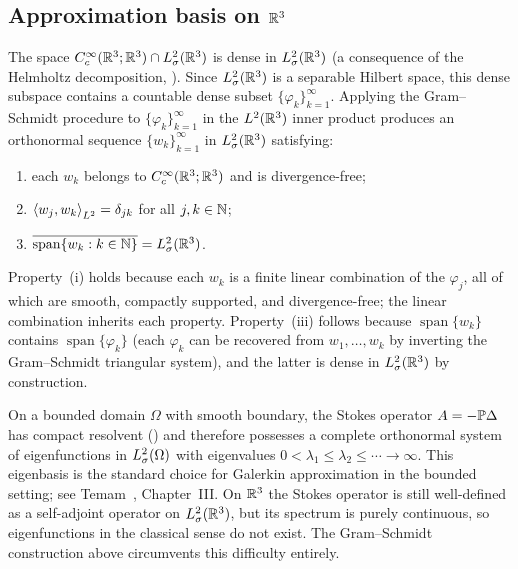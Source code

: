 \subsection{Approximation basis on $\mathbb{R}^{3}$}

The space $C^\infty_c(\mathbb{R}^{3};\mathbb{R}^{3}) \cap L^{2}_\sigma(\mathbb{R}^{3})$ is dense in $L^{2}_\sigma(\mathbb{R}^{3})$
(a consequence of the Helmholtz decomposition, ).
Since $L^{2}_\sigma(\mathbb{R}^{3})$ is a separable Hilbert space, this dense subspace
contains a countable dense subset
$\{\varphi_{k}\}_{k=1}^{\infty}$.  Applying the Gram--Schmidt procedure to
$\{\varphi_{k}\}_{k=1}^{\infty}$ in the $L^{2}(\mathbb{R}^{3})$ inner product produces an
orthonormal sequence $\{w_{k}\}_{k=1}^{\infty}$ in $L^{2}_\sigma(\mathbb{R}^{3})$ satisfying:
\begin{enumerate}[label=(\roman*)]
  \item each $w_{k}$ belongs to $C^\infty_c(\mathbb{R}^{3};\mathbb{R}^{3})$ and is divergence-free;
  \item $\left\langle w_{j}, w_{k} \right\rangle_{L^{2}} = \delta_{jk}$ for all $j,k \in \mathbb{N}$;
  \item $\overline{\operatorname{span}\{w_{k} : k \in \mathbb{N}\}} = L^{2}_\sigma(\mathbb{R}^{3})$.
\end{enumerate}
Property~(i) holds because each $w_{k}$ is a finite linear combination of the
$\varphi_{j}$, all of which are smooth, compactly supported, and divergence-free;
the linear combination inherits each property.  Property~(iii) follows because
$\operatorname{span}\{w_{k}\}$ contains $\operatorname{span}\{\varphi_{k}\}$
(each $\varphi_{k}$ can be recovered from $w_{1}, \ldots, w_{k}$ by inverting the
Gram--Schmidt triangular system), and the latter is dense in $L^{2}_\sigma(\mathbb{R}^{3})$ by
construction.

\begin{remark}\label{rem:bounded-domain-alternative}
  On a bounded domain $\Omega$ with smooth boundary, the Stokes operator
  $A = -\mathbb{P}\Delta$ has compact
  resolvent ()
  and therefore possesses a complete orthonormal system of eigenfunctions in
  $L^{2}_\sigma(\Omega)$ with eigenvalues
  $0 < \lambda_{1} \le \lambda_{2} \le \cdots \to \infty$.  This eigenbasis is the
  standard choice for Galerkin approximation in the bounded setting; see
  Temam~\cite{temam2001}, Chapter~III.  On $\mathbb{R}^{3}$ the Stokes operator is still
  well-defined as a self-adjoint operator on $L^{2}_\sigma(\mathbb{R}^{3})$, but its spectrum is
  purely continuous, so eigenfunctions in the classical sense do not exist.  The
  Gram--Schmidt construction above circumvents this difficulty entirely.
\end{remark}

